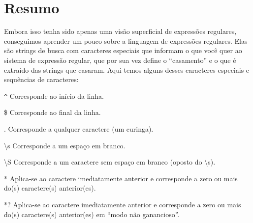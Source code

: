 \section{Resumo}

Embora isso tenha sido apenas uma visão superficial de expressões regulares, conseguimos 
aprender um pouco sobre a linguagem de expressões regulares. Elas são strings de busca com 
caracteres especiais que informam o que você quer ao sistema de expressão regular, que por 
sua vez define o ``casamento'' e o que é extraído das strings que casaram. Aqui temos alguns 
desses caracteres especiais e sequências de caracteres:

\verb"^" \newline
Corresponde ao início da linha.

\$ \newline
Corresponde ao final da linha.

. \newline
Corresponde a qualquer caractere (um curinga).

{\textbackslash}s \newline
Corresponde a um espaço em branco.

{\textbackslash}S \newline
Corresponde a um caractere sem espaço em branco (oposto do {\textbackslash}s).

* \newline
Aplica-se ao caractere imediatamente anterior e corresponde a zero ou mais do(s) caractere(s)
anterior(es).

*? \newline
Aplica-se ao caractere imediatamente anterior e corresponde a zero ou mais do(s) caractere(s) 
anterior(es) em ``modo não ganancioso''.

